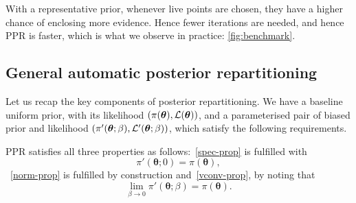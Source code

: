 \documentclass[usenatbib]{mnras}
\begin{document}
With a representative prior, whenever live points are chosen, they
have a higher chance of enclosing more evidence. Hence fewer
iterations are needed, and hence PPR is faster, which is what we
observe in practice: \cref{fig:benchmark}.

\subsection{General automatic posterior repartitioning}

Let us recap the key components of posterior repartitioning. We
have a baseline uniform prior, with its likelihood \((\pi(\bm{\theta}),
   \cal L (\bm{\theta}))\), and a parameterised pair of biased prior and
likelihood \((\pi'(\bm{\theta}; \beta), \cal L' (\bm{\theta}; \beta))\), which
satisfy the following requirements.


PPR satisfies all three properties as follows:~\vref{spec-prop} is
fulfilled with \[\pi'(\bm{\theta}; 0) =\pi(\bm{\theta}),\]~\cref{norm-prop} is
fulfilled by construction and~\cref{vconv-prop}, by noting that
\[\lim_{\beta \rightarrow 0} \pi'(\bm{\theta}; \beta) =
  \pi(\bm{\theta}).\]
\end{document}
